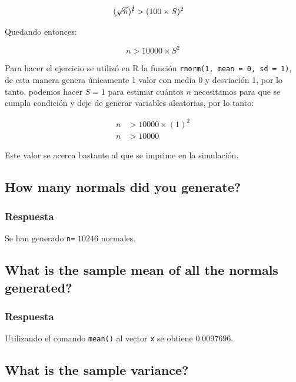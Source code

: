 \documentclass[12pt]{article}\usepackage[]{graphicx}\usepackage[]{xcolor}
\begin{document}
\begin{align*}
  (\cancel{\sqrt{n}})^{\cancel{2}} &> (100 \times S)^{2} 
\end{align*}

Quedando entonces:

\[
n > 10000\times S^{2}
\]

Para hacer el ejercicio se utilizó en \textsf{R} la función \texttt{rnorm(1, mean = 0, sd = 1)}, de esta manera genera únicamente 1 valor con media 0 y desviación 1, por lo tanto, podemos hacer $S = 1$ para estimar cuántos $n$ necesitamos para que se cumpla condición y deje de generar variables aleatorias, por lo tanto:

\begin{align*}
  n &> 10000 \times (1)^{2} \\
  n &> 10000 
\end{align*}

Este valor se acerca bastante al que se imprime en la simulación. 











\subsection{How many normals did you generate?}
\label{subsec:p1-b}

\subsubsection{Respuesta}

Se han generado \lstinline|n=| $10246$ normales.


\subsection{What is the sample mean of all the normals generated?}
\label{subsec:p1-c}




\subsubsection{Respuesta}

Utilizando el comando \lstinline|mean()| al vector \lstinline|x| se obtiene $0.0097696$. 

\subsection{What is the sample variance?}
\label{subsec:p1-d}
\end{document}
